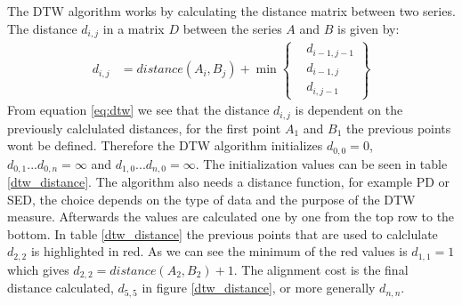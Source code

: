 The DTW algorithm works by calculating the distance matrix between two series. The distance $d_{i,j}$ in a matrix $D$ between the series $A$ and $B$ is given by:
\begin{equation}
    \label{eq:dtw}
    \begin{aligned}
        d_{i, j} & = distance(A_{i}, B_{j}) + \min \left\{ \begin{aligned}
                                                                & d_{i-1, j-1} \\
                                                                & d_{i-1, j}   \\
                                                                & d_{i, j-1}
                                                           \end{aligned} \right\}
    \end{aligned}
\end{equation}
From equation \ref{eq:dtw} we see that the distance $d_{i, j}$ is dependent on the previously calclulated distances, for the first point $A_{1}$ and $B_{1}$ the previous points wont be defined. Therefore the DTW algorithm initializes $d_{0,0} = 0$, $d_{0, 1}...d_{0, n} = \infty$ and $d_{1, 0}...d_{n, 0} = \infty$. The initialization values can be seen in table \ref{dtw_distance}. The algorithm also needs a distance function, for example PD or SED, the choice depends on the type of data and the purpose of the DTW measure. Afterwards the values are calculated one by one from the top row to the bottom. In table \ref*{dtw_distance} the previous points that are used to calclulate $d_{2,2}$ is highlighted in red. As we can see the minimum of the red values is $d_{1,1} = 1$ which gives $d_{2, 2} = distance(A_{2}, B_{2}) + 1$. The alignment cost is the final distance calculated, $d_{5,5}$ in figure \ref*{dtw_distance}, or more generally $d_{n,n}$.

